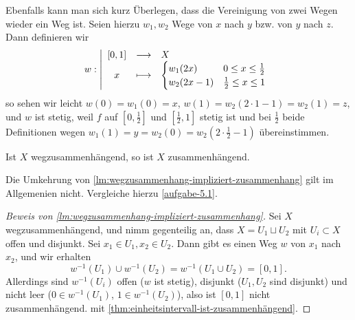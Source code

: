 \begin{remark*}
    Ebenfalls kann man sich kurz Überlegen, dass die Vereinigung von zwei Wegen wieder ein Weg ist. Seien hierzu $w_1,w_2$ Wege von $x$ nach  $y$ bzw. von  $y$ nach  $z$. Dann definieren  wir
        \begin{equation*}
        w: \left| \begin{array}{c c l} 
            [0,1] & \longrightarrow & X \\
        x & \longmapsto &  \begin{cases}
            w_1(2x) & 0\leq x\leq \frac{1}{2} \\
            w_2(2x-1) & \frac{1}{2} \leq  x \leq  1
        \end{cases}
        \end{array} \right.
    \end{equation*}
    so sehen wir leicht $w(0) = w_1(0) = x$, $w(1) = w_2(2\cdot 1-1) = w_2(1) = z$, und $w$ ist stetig, weil $f$ auf  $[0,\frac{1}{2}]$ und $[\frac{1}{2},1]$  stetig ist und bei $\frac{1}{2}$ beide Definitionen wegen $w_1(1) = y = w_2(0) = w_2(2\cdot \frac{1}{2}-1)$ übereinstimmen.
\end{remark*}

\begin{lemma}\label{lm:wegzusammenhang-impliziert-zusammenhang}
    Ist $X$ wegzusammenhängend, so ist  $X$ zusammenhängend.
\end{lemma}

\begin{warning}
    Die Umkehrung von \autoref{lm:wegzusammenhang-impliziert-zusammenhang} gilt im Allgemenien nicht. Vergleiche hierzu \autoref{aufgabe-5.1}.
\end{warning}

\begin{proof}[Beweis von \autoref{lm:wegzusammenhang-impliziert-zusammenhang}]
    Sei $X$ wegzusammenhängend, und nimm gegenteilig an, dass  $X = U_1 \sqcup U_2$ mit $U_i \subset X$ offen und disjunkt. Sei $x_1 \in U_1, x_2\in U_2$. Dann gibt es einen Weg $w$ von  $x_1$ nach $x_2$, und  wir erhalten
    \[
        w^{-1}(U_1) \cup w^{-1}(U_2) = w^{-1}(U_1\cup U_2) = [0,1]
    .\] 
    Allerdings sind $w^{-1}(U_i)$ offen ($w$ ist stetig), disjunkt ($U_1,U_2$ sind disjunkt) und nicht leer ($0\in w^{-1}(U_1)$, $1\in w^{-1}(U_2)$), also ist $[0,1]$ nicht zusammenhängend. \contra mit \autoref{thm:einheitsintervall-ist-zusammenhängend}.
\end{proof}

